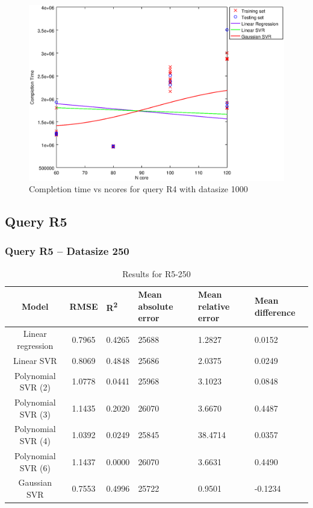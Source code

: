 \documentclass[a4paper,11pt]{article}
\begin{document}
\begin {figure}[hbtp]
\centering
\includegraphics[width=\textwidth]{output/R4_1000_LINEAR_NCORE/plot_R4_1000_bestmodels.eps}
\caption{Completion time vs ncores for query R4 with datasize 1000}
\label{fig:all_linear_R4_1000}
\end {figure}

\newpage
\subsection{Query R5}
\subsubsection{Query R5 -- Datasize 250}

\begin{table}[H]
	\centering
	\begin{adjustbox}{center}
		\begin{tabular}{c | c M{1.2cm} M{2.5cm} M{2.5cm} M{1.8cm}}
			Model & RMSE & R\textsuperscript{2} & Mean absolute error & Mean relative error & Mean difference \tabularnewline
			\hline
			Linear regression & 0.7965 & 0.4265 &  25688 & 1.2827 & 0.0152 \\
			Linear SVR & 0.8069 & 0.4848 &  25686 & 2.0375 & 0.0249 \\
			Polynomial SVR (2) & 1.0778 & 0.0441 &  25968 & 3.1023 & 0.0848 \\
			Polynomial SVR (3) & 1.1435 & 0.2020 &  26070 & 3.6670 & 0.4487 \\
			Polynomial SVR (4) & 1.0392 & 0.0249 &  25845 & 38.4714 & 0.0357 \\
			Polynomial SVR (6) & 1.1437 & 0.0000 &  26070 & 3.6631 & 0.4490 \\
			Gaussian SVR & 0.7553 & 0.4996 &  25722 & 0.9501 & -0.1234 \\
		\end{tabular}
	\end{adjustbox}
	\\
	\caption{Results for R5-250}
	\label{fig:all_linear_R5_250}
\end{table}
\end{document}
